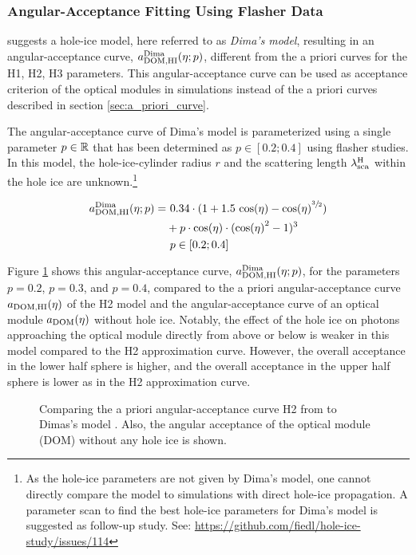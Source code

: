 \subsubsection{Angular-Acceptance Fitting Using Flasher Data}
\label{sec:dimas_model}

\chirkin \cite{flasherdataderivedicemodels} suggests a hole-ice model,
here referred to as \textit{Dima's model}, resulting in an
angular-acceptance curve, \(a_\text{DOM,HI}^\text{Dima}(\eta;p)\), different from the a
priori curves for the H1, H2, H3 parameters. This angular-acceptance
curve can be used as acceptance criterion of the optical modules in
simulations instead of the a priori curves described in section
\ref{sec:a_priori_curve}.

The angular-acceptance curve of Dima's model is parameterized using a
single parameter \(p\in\mathbb{R}\) that has been determined as
\(p \in [0.2;0.4]\) using flasher studies. \cite{msuforwardholeice} In
this model, the hole-ice-cylinder radius \(r\) and the scattering length
\(\lambda_\text{sca}^\text{H}\) within the hole ice are
unknown.\footnote{As the hole-ice parameters are not given by Dima's model, one cannot directly compare the model to \clsim simulations with direct hole-ice propagation. A parameter scan to find the best hole-ice parameters for Dima's model is suggested as follow-up study. See: \url{https://github.com/fiedl/hole-ice-study/issues/114} \followup}

\begin{align}
  a_\text{DOM,HI}^\text{Dima}(\eta;p) = & \ 0.34 \cdot (1 + 1.5\,\cos(\eta) - \cos(\eta)^{\sfrac{3}{2}}) \nonumber \\
      & + p \cdot \cos(\eta) \cdot  (\cos(\eta)^2 - 1)^3 \\
      & \ p \in [0.2;0.4] \nonumber
  \label{eq:adima}
\end{align}

Figure \ref{fig:Vohn9Oov} shows this angular-acceptance curve,
\(a_\text{DOM,HI}^\text{Dima}(\eta;p)\), for the parameters \(p=0.2\), \(p=0.3\), and
\(p=0.4\), compared to the a priori angular-acceptance curve
\(a_\text{DOM,HI}(\eta)\) of the H2 model and the angular-acceptance curve of an
optical module \(a_\text{DOM}(\eta)\) without hole ice. Notably, the effect of
the hole ice on photons approaching the optical module directly from
above or below is weaker in this model compared to the H2 approximation
curve. However, the overall acceptance in the lower half sphere is
higher, and the overall acceptance in the upper half sphere is lower as
in the H2 approximation curve.

\begin{figure}[htbp]
  \caption{Comparing the a priori angular-acceptance curve H2 from \cite{icepaper} to Dimas's model \cite{flasherdataderivedicemodels}. Also, the angular acceptance of the optical module (DOM) without any hole ice is shown.}
  \label{fig:Vohn9Oov}
\end{figure}

